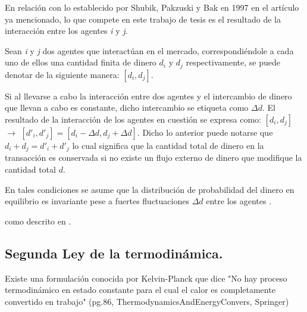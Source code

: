 En relación con lo establecido por Shubik, Pakzuski y Bak en 1997 en el artículo ya mencionado, lo que compete en este trabajo de tesis es el resultado de la interacción entre los agentes \textit{i} y \textit{j}. 

Sean \textit{i} y \textit{j} dos agentes que interactúan en el mercado, correspondiéndole a cada uno de ellos una cantidad finita de dinero $d_{i}$ y $d_{j}$ respectivamente, se puede denotar de la siguiente manera: $[d_{i},d_{j}]$. 

Si al llevarse a cabo la interacción entre dos agentes y el intercambio de dinero que llevan a cabo es constante, dicho intercambio se etiqueta como $\Delta d$. El resultado de la interacción de los agentes en cuestión se expresa como:  $[d_{i},d_{j}]$ $\longrightarrow$  $[d'_{i},d'_{j}] = [d_{i} - \Delta d ,d_{j} + \Delta d]$. Dicho lo anterior puede notarse que $d_{i} + d_{j} = d'_{i} + d'_{j}$ lo cual significa que la cantidad total de dinero en la transacción es conservada si no existe un flujo externo de dinero que modifique la cantidad total $d$.

En tales condiciones se asume que la distribución de probabilidad del dinero en equilibrio es invariante pese a fuertes fluctuaciones $\Delta d$ entre los agentes \citep[][pagina 149]{cottrell_classical_2009}.



como descrito en \citep{Huang2021}.



\subsection{Segunda Ley de la termodinámica.} 


%



Existe una formulación conocida por Kelvin-Planck que dice "No hay proceso termodinámico en estado constante para el cual el calor es completamente convertido en trabajo" (pg.86, ThermodynamicsAndEnergyConvers, Springer)

